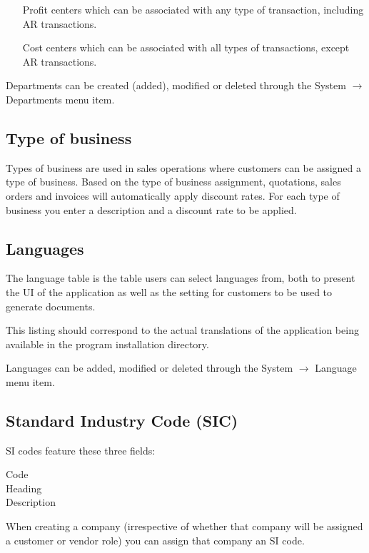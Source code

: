 \begin{itemize}
\item [Profit centers] which can be associated with any type of transaction, including AR transactions.
\item [Cost centers] which can be associated with all types of transactions, except AR transactions.
\end{itemize}

Departments can be created (added), modified or deleted through the System $\rightarrow$ Departments menu item.

\subsection{Type of business}

Types of business are used in sales operations where customers can be assigned a type
of business. Based on the type of business assignment, quotations, sales orders and
invoices will automatically apply discount rates. For each type of business you enter a description and a discount rate to be applied.

\subsection{Languages}

The language table is the table users can select languages from, both to present
the UI of the application as well as the setting for customers to be used to generate
documents.

This listing should correspond to the actual translations of the application being
available in the program installation directory.

Languages can be added, modified or deleted through the System $\rightarrow$ Language menu item.

\subsection{Standard Industry Code (SIC)}

SI codes feature these three fields:

\begin{description}
\item [Code]
\item [Heading]
\item [Description]
\end{description}

When creating a company (irrespective of whether that company will be assigned a customer
or vendor role) you can assign that company an SI code.

